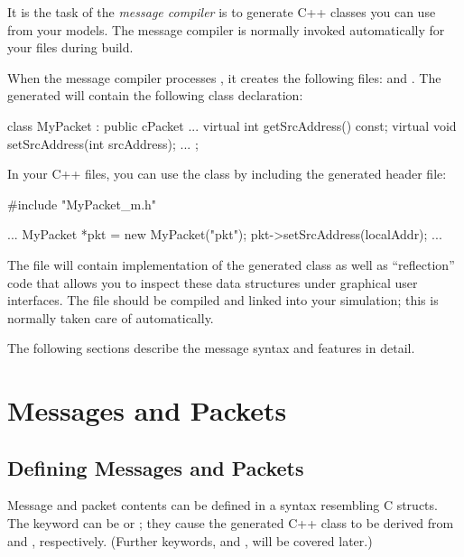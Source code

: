 It is the task of the \textit{message compiler} is to generate C++ classes
you can use from your models. The message compiler is normally invoked
automatically for your  files during build.

When the message compiler processes , it creates the
following files:  and . The
generated  will contain the following class declaration:

\begin{cpp}
class MyPacket : public cPacket {
    ...
    virtual int getSrcAddress() const;
    virtual void setSrcAddress(int srcAddress);
    ...
};
\end{cpp}

In your C++ files, you can use the  class by including the
generated header file:

\begin{cpp}
#include "MyPacket_m.h"

...
MyPacket *pkt = new MyPacket("pkt");
pkt->setSrcAddress(localAddr);
...
\end{cpp}

The  file will contain implementation of the generated
 class as well as ``reflection'' code that allows you to
inspect these data structures under graphical user interfaces. The
 file should be compiled and linked into your
simulation; this is normally taken care of automatically.

The following sections describe the message syntax and features in detail.



\section{Messages and Packets}
\label{sec:msg-defs:messages-and-packets}

\subsection{Defining Messages and Packets}
\label{sec:msg-defs:defining-messages-and-packets}

Message and packet contents can be defined in a syntax resembling C structs.
The keyword can be  or ; they cause
the generated C++ class to be derived from  and
, respectively. (Further keywords,  and
, will be covered later.)

